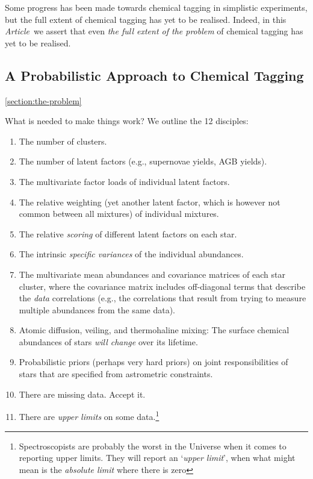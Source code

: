 \documentclass{aastex61}
\newcommand{\article}{\emph{Article}}
\begin{document}
Some progress has been made towards chemical tagging in simplistic experiments, 
but the full extent of chemical tagging has yet to be realised. Indeed, in this 
\article\ we assert that even \emph{the full extent of the problem} of chemical 
tagging has yet to be realised. 

\subsection*{A Probabilistic Approach to Chemical Tagging}
\ref{section:the-problem}


What is needed to make things work? We outline the 12 disciples:

\begin{enumerate}
\item The number of clusters.
\item The number of latent factors (e.g., supernovae yields, AGB yields).
\item The multivariate factor loads of individual latent factors.
\item The relative weighting (yet another latent factor, which is however not
      common between all mixtures) of individual mixtures.
\item The relative \emph{scoring} of different latent factors on each star.
\item The intrinsic \emph{specific variances} of the individual abundances.
\item The multivariate mean abundances and covariance matrices of each star
      cluster, where the covariance matrix includes off-diagonal terms that
      describe the \emph{data} correlations (e.g., the correlations that result
      from trying to measure multiple abundances from the same data).
\item Atomic diffusion, veiling, and thermohaline mixing: The surface chemical
      abundances of stars \emph{will change} over its lifetime.
\item Probabilistic priors (perhaps very hard priors) on joint responsibilities
      of stars that are specified from astrometric constraints.
\item There are missing data. Accept it.
\item There are \emph{upper limits} on some data.\footnote{
        Spectroscopists are probably the worst in the Universe when it comes to
        reporting upper limits. They will report an `\emph{upper limit}', when
        what might mean is the \emph{absolute limit} where there is zero
}
\end{enumerate}
\end{document}
